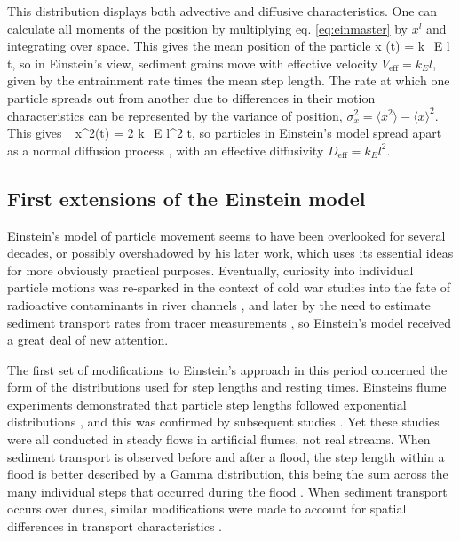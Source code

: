 This distribution displays both advective and diffusive characteristics.
One can calculate all moments of the position by multiplying eq. \ref{eq:einmaster} by $x^l$ and integrating over space. This gives the mean position of the particle
\be \langle x \rangle (t) = k_E l t, \ee
so in Einstein's view, sediment grains move with effective velocity $V_\text{eff} = k_E l$, given by the entrainment rate times the mean step length.
The rate at which one particle spreads out from another due to differences in their motion characteristics can be represented by the variance of position, $\sigma_x^2  = \langle x^2 \rangle - \langle x \rangle^2$. This gives
\be \sigma_x^2(t) = 2 k_E l^2 t, \ee
so particles in Einstein's model spread apart as a normal diffusion process \citep{Sokolev2002}, with an effective diffusivity $D_\text{eff} = k_E l^2.$

\subsection{First extensions of the Einstein model}

Einstein's model of particle movement seems to have been overlooked for several decades, or possibly overshadowed by his later work, which uses its essential ideas for more obviously practical purposes.
Eventually, curiosity into individual particle motions was re-sparked in the context of cold war studies into the fate of radioactive contaminants in river channels \citep{Crickmore1962, Hubbell1964, Sayre1965,Yang1971}, and later by the need to estimate sediment transport rates from tracer measurements \citep{Yano1969, Todorovic1975, Nakagawa1976, Nakagawa1980, Hassan1991}, so Einstein's model received a great deal of new attention.

The first set of modifications to Einstein's approach in this period concerned the form of the distributions used for step lengths and resting times. Einsteins flume experiments demonstrated that particle step lengths followed exponential distributions \citep{1937}, and this was confirmed by subsequent studies \citep{Yano1969, Nakagawa1976}. Yet these studies were all conducted in steady flows in artificial flumes, not real streams. When sediment transport is observed before and after a flood, the step length within a flood is better described by a Gamma distribution, this being the sum across the many individual steps that occurred during the flood \citep{Hassan1991}. When sediment transport occurs over dunes, similar modifications were made to account for spatial differences in transport characteristics \citep{Crickmore1962, Hubbell1964, Sayre1965}.

